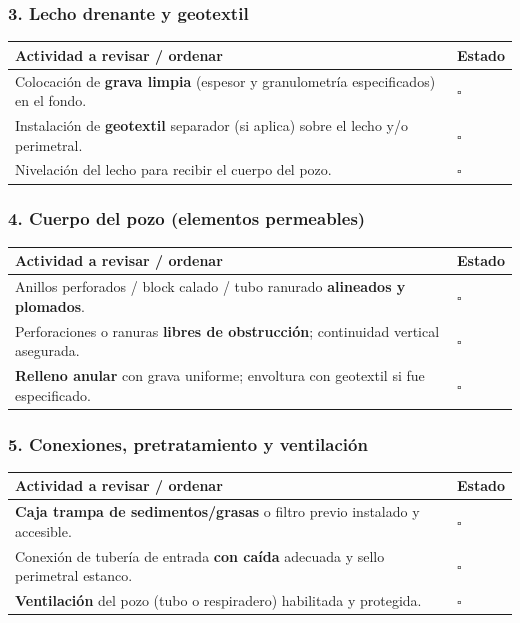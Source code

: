 \documentclass[12pt]{article}
\newcommand{\cbox}{\(\square\)} %
\begin{document}
	\subsubsection*{3. Lecho drenante y geotextil}
	\begin{tabularx}{\linewidth}{>{\raggedright\arraybackslash}p{0.93\linewidth} >{\centering\arraybackslash}m{0.07\linewidth}}
		\toprule
		\textbf{Actividad a revisar / ordenar} & \textbf{Estado}\\
		\midrule
		Colocación de \textbf{grava limpia} (espesor y granulometría especificados) en el fondo. & \cbox \\
		Instalación de \textbf{geotextil} separador (si aplica) sobre el lecho y/o perimetral. & \cbox \\
		Nivelación del lecho para recibir el cuerpo del pozo. & \cbox \\
		\bottomrule
	\end{tabularx}
	
	\subsubsection*{4. Cuerpo del pozo (elementos permeables)}
	\begin{tabularx}{\linewidth}{>{\raggedright\arraybackslash}p{0.93\linewidth} >{\centering\arraybackslash}m{0.07\linewidth}}
		\toprule
		\textbf{Actividad a revisar / ordenar} & \textbf{Estado}\\
		\midrule
		Anillos perforados / block calado / tubo ranurado \textbf{alineados y plomados}. & \cbox \\
		Perforaciones o ranuras \textbf{libres de obstrucción}; continuidad vertical asegurada. & \cbox \\
		\textbf{Relleno anular} con grava uniforme; envoltura con geotextil si fue especificado. & \cbox \\
		\bottomrule
	\end{tabularx}
	
	\subsubsection*{5. Conexiones, pretratamiento y ventilación}
	\begin{tabularx}{\linewidth}{>{\raggedright\arraybackslash}p{0.93\linewidth} >{\centering\arraybackslash}m{0.07\linewidth}}
		\toprule
		\textbf{Actividad a revisar / ordenar} & \textbf{Estado}\\
		\midrule
		\textbf{Caja trampa de sedimentos/grasas} o filtro previo instalado y accesible. & \cbox \\
		Conexión de tubería de entrada \textbf{con caída} adecuada y sello perimetral estanco. & \cbox \\
		\textbf{Ventilación} del pozo (tubo o respiradero) habilitada y protegida. & \cbox \\
		\bottomrule
	\end{tabularx}
	
\end{document}
